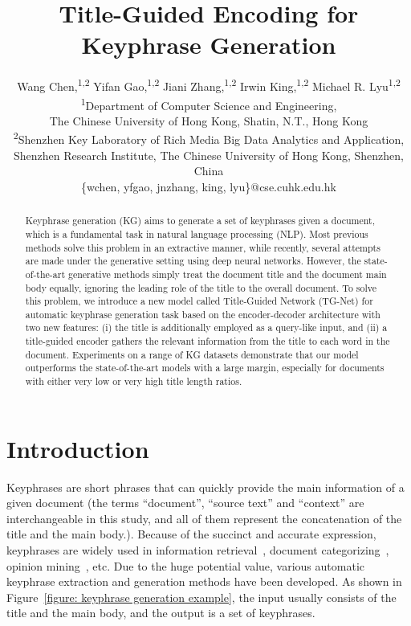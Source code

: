 \documentclass[letterpaper]{article} %
\title{Title-Guided Encoding for Keyphrase Generation}
\author{Wang Chen,\textsuperscript{1,2} Yifan Gao,\textsuperscript{1,2} Jiani Zhang,\textsuperscript{1,2} Irwin King,\textsuperscript{1,2} Michael R. Lyu\textsuperscript{1,2} \\
  \textsuperscript{1}Department of Computer Science and Engineering, \\
The Chinese University of Hong Kong, Shatin, N.T., Hong Kong \\
\textsuperscript{2}Shenzhen Key Laboratory of Rich Media Big Data Analytics and Application, \\
Shenzhen Research Institute, The Chinese University of Hong Kong, Shenzhen, China \\
  \{wchen, yfgao, jnzhang, king, lyu\}@cse.cuhk.edu.hk \\
  }
\begin{document}
%
\maketitle

\begin{abstract}
Keyphrase generation (KG) aims to generate a set of keyphrases given a document, which is a fundamental task in natural language processing (NLP). Most previous methods solve this problem in an extractive manner, while recently, several attempts are made under the generative setting using deep neural networks. However, the state-of-the-art generative methods simply treat the document title and the document main body equally, ignoring the leading role of the title to the overall document. To solve this problem, we introduce a new model called Title-Guided Network (TG-Net) for automatic keyphrase generation task based on the encoder-decoder architecture with two new features: (\textrm{i}) the title is additionally employed as a query-like input, and (\textrm{ii}) a title-guided encoder gathers the relevant information from the title to each word in the document. Experiments on a range of KG datasets demonstrate that our model outperforms the state-of-the-art models with a large margin, especially for documents with either very low or very high title length ratios.
\end{abstract}


\section{Introduction}
Keyphrases are short phrases that can quickly provide the main information of a given document (the terms ``document'', ``source text'' and ``context'' are interchangeable in this study, and all of them represent the concatenation of the title and the main body.). Because of the succinct and accurate expression, keyphrases are widely used in information retrieval~\cite{jones1999phrasier}, document categorizing~\cite{hulth2006study}, opinion mining~\cite{berend2011opinion}, etc. Due to the huge potential value, various automatic keyphrase extraction and generation methods have been developed. As shown in Figure~\ref{figure: keyphrase generation example}, the input usually consists of the title and the main body, and the output is a set of keyphrases.
\end{document}
